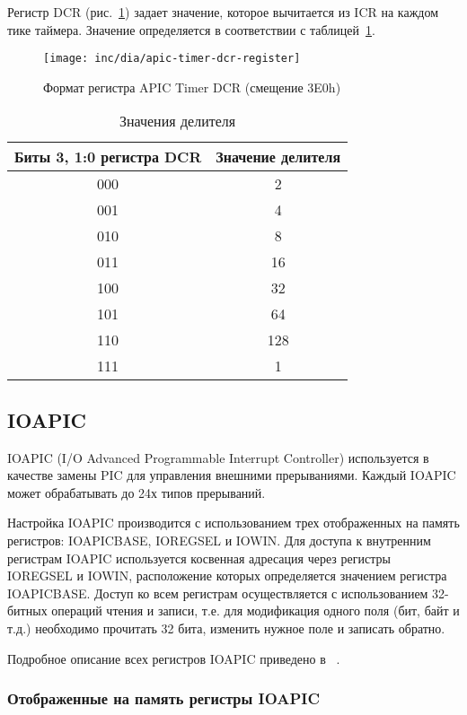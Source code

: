 Регистр DCR (рис.~\ref{fig:apic-timer-dcr-register}) задает значение, которое вычитается из ICR
на каждом тике таймера. Значение определяется в соответствии с таблицей~\ref{tab:apic_timer_dcr_values}.
\begin{figure}[ht!]
  \centering
  \texttt{[image: inc/dia/apic-timer-dcr-register]}
  \caption{Формат регистра APIC Timer DCR (смещение 3E0h)}
  \label{fig:apic-timer-dcr-register}
\end{figure}

\begin{table}[ht!]
  \caption{Значения делителя}
  \label{tab:apic_timer_dcr_values}
  \begin{tabular}{|c|c|}
    \hline
    Биты 3, 1:0 регистра DCR & Значение делителя \\
    \hline
    000 & 2 \\
    \hline
    001 & 4 \\
    \hline
    010 & 8 \\
    \hline
    011 & 16 \\
    \hline
    100 & 32 \\
    \hline
    101 & 64 \\
    \hline
    110 & 128 \\
    \hline
    111 & 1 \\
    \hline
  \end{tabular}
\end{table}

\subsection{IOAPIC}
IOAPIC (I/O Advanced Programmable Interrupt Controller) используется в качестве замены PIC для
управления внешними прерываниями. Каждый IOAPIC может обрабатывать до 24х типов прерываний.

Настройка IOAPIC производится с использованием трех отображенных на память регистров:
IOAPICBASE, IOREGSEL и IOWIN. Для доступа к внутренним регистрам IOAPIC используется косвенная
адресация через регистры IOREGSEL и IOWIN, расположение которых определяется значением
регистра IOAPICBASE. Доступ ко всем регистрам осуществляется с использованием 32-битных
операций чтения и записи, т.е. для модификация одного поля (бит, байт и т.д.) необходимо
прочитать 32 бита, изменить нужное поле и записать обратно.

Подробное описание всех регистров IOAPIC приведено в ~\cite{ioapic}.

\subsubsection*{Отображенные на память регистры IOAPIC}
